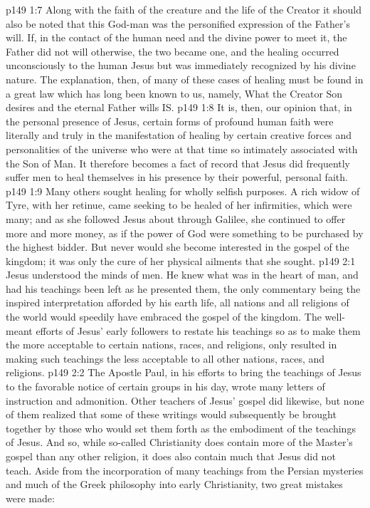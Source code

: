 \pc \vs p149 1:7 \bibnobreakspace Along with the faith of the creature and the life of the Creator it should also be noted that this God\hyp{}man was the personified expression of the Father’s will. If, in the contact of the human need and the divine power to meet it, the Father did not will otherwise, the two became one, and the healing occurred unconsciously to the human Jesus but was immediately recognized by his divine nature. The explanation, then, of many of these cases of healing must be found in a great law which has long been known to us, namely, What the Creator Son desires and the eternal Father wills IS.
\pc \vs p149 1:8 It is, then, our opinion that, in the personal presence of Jesus, certain forms of profound human faith were literally and truly  in the manifestation of healing by certain creative forces and personalities of the universe who were at that time so intimately associated with the Son of Man. It therefore becomes a fact of record that Jesus did frequently suffer men to heal themselves in his presence by their powerful, personal faith.
\vs p149 1:9 Many others sought healing for wholly selfish purposes. A rich widow of Tyre, with her retinue, came seeking to be healed of her infirmities, which were many; and as she followed Jesus about through Galilee, she continued to offer more and more money, as if the power of God were something to be purchased by the highest bidder. But never would she become interested in the gospel of the kingdom; it was only the cure of her physical ailments that she sought.
\vs p149 2:1 Jesus understood the minds of men. He knew what was in the heart of man, and had his teachings been left as he presented them, the only commentary being the inspired interpretation afforded by his earth life, all nations and all religions of the world would speedily have embraced the gospel of the kingdom. The well\hyp{}meant efforts of Jesus’ early followers to restate his teachings so as to make them the more acceptable to certain nations, races, and religions, only resulted in making such teachings the less acceptable to all other nations, races, and religions.
\vs p149 2:2 The Apostle Paul, in his efforts to bring the teachings of Jesus to the favorable notice of certain groups in his day, wrote many letters of instruction and admonition. Other teachers of Jesus’ gospel did likewise, but none of them realized that some of these writings would subsequently be brought together by those who would set them forth as the embodiment of the teachings of Jesus. And so, while so\hyp{}called Christianity does contain more of the Master’s gospel than any other religion, it does also contain much that Jesus did not teach. Aside from the incorporation of many teachings from the Persian mysteries and much of the Greek philosophy into early Christianity, two great mistakes were made:
